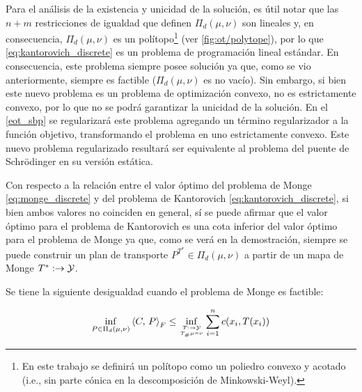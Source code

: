 Para el análisis de la existencia y unicidad de la solución, es útil notar que las $n+m$ restricciones de igualdad que definen $\Pi_d(\mu,\nu)$ son lineales y, en consecuencia, $\Pi_d(\mu,\nu)$ es un polítopo\footnote{En este trabajo se definirá un polítopo como un poliedro convexo y acotado (i.e., sin parte cónica en la descomposición de Minkowski-Weyl).} (ver \autoref{fig:ot/polytope}), por lo que \eqref{eq:kantorovich_discrete} es un problema de programación lineal estándar. En consecuencia, este problema siempre posee solución ya que, como se vio anteriormente, siempre es factible ($\Pi_d(\mu,\nu)$ es no vacío). Sin embargo, si bien este nuevo problema es un problema de optimización convexo, no es estrictamente convexo, por lo que no se podrá garantizar la unicidad de la solución. En el \autoref{eot_sbp} se regularizará este problema agregando un término regularizador a la función objetivo, transformando el problema en uno estrictamente convexo. Este nuevo problema regularizado resultará ser equivalente al problema del puente de Schrödinger en su versión estática.


Con respecto a la relación entre el valor óptimo del problema de Monge \eqref{eq:monge_discrete} y del problema de Kantorovich \eqref{eq:kantorovich_discrete}, si bien ambos valores no coinciden en general, sí se puede afirmar que el valor óptimo para el problema de Kantorovich es una cota inferior del valor óptimo para el problema de Monge ya que, como se verá en la demostración, siempre se puede construir un plan de transporte $P^{T^*}\in\Pi_d(\mu,\nu)$ a partir de un mapa de Monge $T^*:\to\mathcal{Y}$.

\begin{prop}
	\label{prop:monge_kantorovich_discrete_inequality}
	Se tiene la siguiente desigualdad cuando el problema de Monge es factible:

	\begin{equation*}
		\inf_{P\in \Pi_d(\mu,\nu)} \dotproduct{C}{P}_F
		\leq \inf_{\feasible{T:\xspace\to\yspace}{T_\#\mu=\nu}}
		\sum_{i=1}^n c(x_i,T(x_i))
	\end{equation*}
\end{prop}

